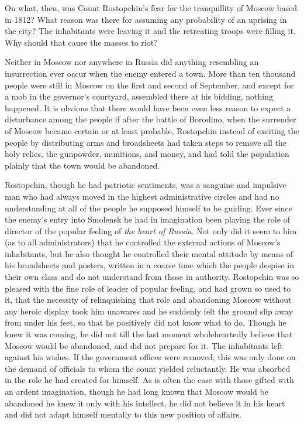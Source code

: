 On what, then, was Count Rostopchin's fear for the tranquillity
of Moscow based in 1812? What reason was there for assuming any
probability of an uprising in the city? The inhabitants were
leaving it and the retreating troops were filling it. Why should
that cause the masses to riot?

Neither in Moscow nor anywhere in Russia did anything resembling
an insurrection ever occur when the enemy entered a town. More
than ten thousand people were still in Moscow on the first and
second of September, and except for a mob in the governor's
courtyard, assembled there at his bidding, nothing happened. It
is obvious that there would have been even less reason to expect
a disturbance among the people if after the battle of Borodino,
when the surrender of Moscow became certain or at least probable,
Rostopchin instead of exciting the people by distributing arms
and broadsheets had taken steps to remove all the holy relics,
the gunpowder, munitions, and money, and had told the population
plainly that the town would be abandoned.

Rostopchin, though he had patriotic sentiments, was a sanguine
and impulsive man who had always moved in the highest
administrative circles and had no understanding at all of the
people he supposed himself to be guiding. Ever since the enemy's
entry into Smolensk he had in imagination been playing the role
of director of the popular feeling of \emph{the heart of Russia}.
Not only did it seem to him (as to all administrators) that he
controlled the external actions of Moscow's inhabitants, but he
also thought he controlled their mental attitude by means of his
broadsheets and posters, written in a coarse tone which the
people despise in their own class and do not understand from
those in authority. Rostopchin was so pleased with the fine role
of leader of popular feeling, and had grown so used to it, that
the necessity of relinquishing that role and abandoning Moscow
without any heroic display took him unawares and he suddenly felt
the ground slip away from under his feet, so that he positively
did not know what to do. Though he knew it was coming, he did not
till the last moment wholeheartedly believe that Moscow would be
abandoned, and did not prepare for it. The inhabitants left
against his wishes. If the government offices were removed, this
was only done on the demand of officials to whom the count
yielded reluctantly. He was absorbed in the role he had created
for himself. As is often the case with those gifted with an
ardent imagination, though he had long known that Moscow would be
abandoned he knew it only with his intellect, he did not believe
it in his heart and did not adapt himself mentally to this new
position of affairs.

